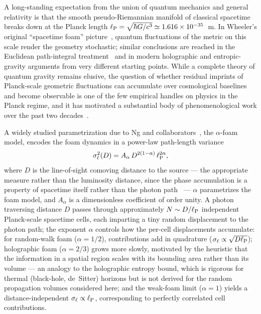 \documentclass[aps,prd,onecolumn,amsmath,amssymb]{revtex4-2}
\begin{document}
A long-standing expectation from the union of quantum mechanics and general
relativity is that the smooth pseudo-Riemannian manifold of classical spacetime
breaks down at the Planck length
$\ell_{\rm P} = \sqrt{\hbar G/c^3} \simeq 1.616\times 10^{-35}$~m.
In Wheeler's original ``spacetime foam'' picture~\cite{Wheeler1955}, quantum
fluctuations of the metric on this scale render the geometry stochastic;
similar conclusions are reached in the Euclidean path-integral
treatment~\cite{Hawking1978} and in modern holographic and entropic-gravity
arguments from very different starting points.
While a complete theory of quantum gravity remains elusive, the question of
whether residual imprints of Planck-scale geometric fluctuations can accumulate
over cosmological baselines and become observable is one of the few empirical
handles on physics in the Planck regime, and it has motivated a substantial
body of phenomenological work over the past two
decades~\cite{Carlip2023,NgPerlman2022}.

A widely studied parametrization due to Ng and
collaborators~\cite{Ng2001,Ng2003,NgPerlman2022}, the $\alpha$-foam model,
encodes the foam dynamics in a power-law path-length variance
\begin{equation}
  \sigma_\ell^2(D) = A_\alpha\,D^{2(1-\alpha)}\,\ell_{\rm P}^{2\alpha},
  \label{eq:NgPerlmanVar}
\end{equation}
where $D$ is the line-of-sight comoving distance to the source --- the
appropriate measure rather than the luminosity distance, since the phase
accumulation is a property of spacetime itself rather than the photon
path~\cite{NgPerlman2022} --- $\alpha$ parametrizes the foam model, and
$A_\alpha$ is a dimensionless coefficient of order unity.
A photon traversing distance $D$ passes through approximately
$N \sim D/\ell_{\rm P}$ independent Planck-scale spacetime cells, each imparting
a tiny random displacement to the photon path; the exponent $\alpha$ controls
how the per-cell displacements accumulate: for random-walk foam ($\alpha=1/2$),
contributions add in quadrature ($\sigma_\ell \propto \sqrt{D\ell_{\rm P}}$);
holographic foam ($\alpha=2/3$) grows more slowly, motivated by the heuristic
that the information in a spatial region scales with its bounding area rather
than its volume --- an analogy to the holographic entropy bound, which is
rigorous for thermal (black-hole, de~Sitter) horizons but is not derived for
the random propagation volumes considered here; and
the weak-foam limit ($\alpha=1$) yields a distance-independent
$\sigma_\ell \propto \ell_{\rm P}$, corresponding to perfectly correlated cell
contributions.
\end{document}
